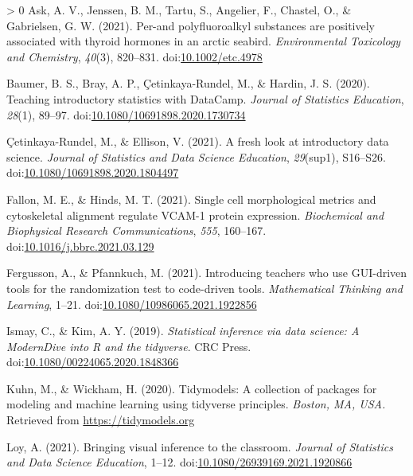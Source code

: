 \documentclass[10pt,a4paper,onecolumn]{article}
\newlength{\cslhangindent}
\newenvironment{CSLReferences}[3] %
 {%
  \setlength{\parindent}{0pt}
  \ifodd #1 \everypar{\setlength{\hangindent}{\cslhangindent}}\ignorespaces\fi
  \ifnum #2 > 0
  \setlength{\parskip}{#2\baselineskip}
  \fi
 }%
 {}
\begin{document}
\hypertarget{refs}{}
\begin{CSLReferences}{1}{0}
\leavevmode\hypertarget{ref-ask2021per}{}%
Ask, A. V., Jenssen, B. M., Tartu, S., Angelier, F., Chastel, O., \&
Gabrielsen, G. W. (2021). Per-and polyfluoroalkyl substances are
positively associated with thyroid hormones in an arctic seabird.
\emph{Environmental Toxicology and Chemistry}, \emph{40}(3), 820--831.
doi:\href{https://doi.org/10.1002/etc.4978}{10.1002/etc.4978}

\leavevmode\hypertarget{ref-baumer2020teaching}{}%
Baumer, B. S., Bray, A. P., Çetinkaya-Rundel, M., \& Hardin, J. S.
(2020). Teaching introductory statistics with DataCamp. \emph{Journal of
Statistics Education}, \emph{28}(1), 89--97.
doi:\href{https://doi.org/10.1080/10691898.2020.1730734}{10.1080/10691898.2020.1730734}

\leavevmode\hypertarget{ref-cetinkaya2021fresh}{}%
Çetinkaya-Rundel, M., \& Ellison, V. (2021). A fresh look at
introductory data science. \emph{Journal of Statistics and Data Science
Education}, \emph{29}(sup1), S16--S26.
doi:\href{https://doi.org/10.1080/10691898.2020.1804497}{10.1080/10691898.2020.1804497}

\leavevmode\hypertarget{ref-fallon2021single}{}%
Fallon, M. E., \& Hinds, M. T. (2021). Single cell morphological metrics
and cytoskeletal alignment regulate VCAM-1 protein expression.
\emph{Biochemical and Biophysical Research Communications}, \emph{555},
160--167.
doi:\href{https://doi.org/10.1016/j.bbrc.2021.03.129}{10.1016/j.bbrc.2021.03.129}

\leavevmode\hypertarget{ref-fergusson2021introducing}{}%
Fergusson, A., \& Pfannkuch, M. (2021). Introducing teachers who use
GUI-driven tools for the randomization test to code-driven tools.
\emph{Mathematical Thinking and Learning}, 1--21.
doi:\href{https://doi.org/10.1080/10986065.2021.1922856}{10.1080/10986065.2021.1922856}

\leavevmode\hypertarget{ref-ismay2019statistical}{}%
Ismay, C., \& Kim, A. Y. (2019). \emph{Statistical inference via data
science: A ModernDive into {R} and the tidyverse}. CRC Press.
doi:\href{https://doi.org/10.1080/00224065.2020.1848366}{10.1080/00224065.2020.1848366}

\leavevmode\hypertarget{ref-kuhn2020tidymodels}{}%
Kuhn, M., \& Wickham, H. (2020). Tidymodels: A collection of packages
for modeling and machine learning using tidyverse principles.
\emph{Boston, MA, USA.} Retrieved from \url{https://tidymodels.org}

\leavevmode\hypertarget{ref-loy2021bringing}{}%
Loy, A. (2021). Bringing visual inference to the classroom.
\emph{Journal of Statistics and Data Science Education}, 1--12.
doi:\href{https://doi.org/10.1080/26939169.2021.1920866}{10.1080/26939169.2021.1920866}


\end{CSLReferences}
\end{document}
